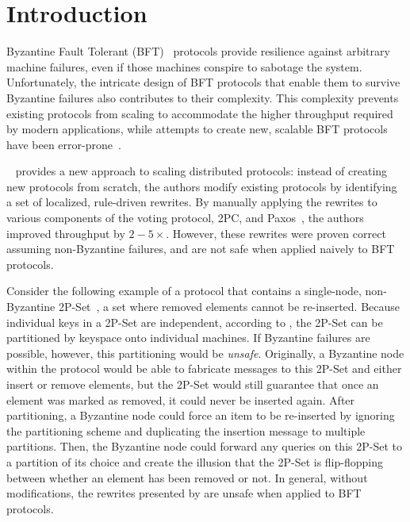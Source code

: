 \section{Introduction}
\label{sec:intro}

Byzantine Fault Tolerant (BFT)~\cite{byzantineGenerals} protocols provide resilience against arbitrary machine failures, even if those machines conspire to sabotage the system.
Unfortunately, the intricate design of BFT protocols that enable them to survive Byzantine failures also contributes to their complexity.
This complexity prevents existing protocols from scaling to accommodate the higher throughput required by modern applications, while attempts to create new, scalable BFT protocols have been error-prone~\cite{zyzzyvaBug, protocolBugsList}.

\sigmodpaper{}~\cite{autocomp} provides a new approach to scaling distributed protocols: instead of creating new protocols from scratch, the authors modify existing protocols by identifying a set of localized, rule-driven rewrites.
By manually applying the rewrites to various components of the voting protocol, 2PC, and Paxos~\cite{paxosComplex}, the authors improved throughput by $2-5\times$.
However, these rewrites were proven correct assuming non-Byzantine failures, and are not safe when applied naively to BFT protocols.

Consider the following example of a protocol that contains a single-node, non-Byzantine 2P-Set~\cite{crdt}, a set where removed elements cannot be re-inserted.
Because individual keys in a 2P-Set are independent, according to \sigmodpaper{}, the 2P-Set can be partitioned by keyspace onto individual machines.
If Byzantine failures are possible, however, this partitioning would be \emph{unsafe}.
Originally, a Byzantine node within the protocol would be able to fabricate messages to this 2P-Set and either insert or remove elements, but the 2P-Set would still guarantee that once an element was marked as removed, it could never be inserted again.
After partitioning, a Byzantine node could force an item to be re-inserted by ignoring the partitioning scheme and duplicating the insertion message to multiple partitions.
Then, the Byzantine node could forward any queries on this 2P-Set to a partition of its choice and create the illusion that the 2P-Set is flip-flopping between whether an element has been removed or not.
In general, without modifications, the rewrites presented by \sigmodpaper{} are unsafe when applied to BFT protocols.
 

